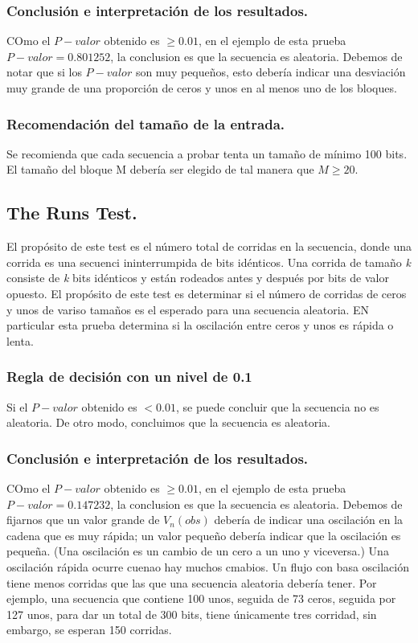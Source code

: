 \documentclass{llncs}
\theoremstyle{plane}
\begin{document}
\subsubsection{Conclusión e interpretación de los resultados.}
COmo el $P-valor$ obtenido es $\geq 0.01$, en el ejemplo de esta prueba $P-valor =0.801252$, la conclusion es que la secuencia es aleatoria.
Debemos de notar que si los $P-valor$ son muy pequeños, esto debería indicar una desviación muy grande de una proporción de ceros y unos en al menos  uno de los bloques.

\subsubsection{Recomendación del tamaño de la entrada.}
Se recomienda que cada secuencia a probar tenta un tamaño de mínimo 100 bits. El tamaño del bloque M debería ser elegido de tal manera que $M \geq 20$.

\subsection{The Runs Test.}
El propósito de este test es el número total de corridas en la secuencia, donde una corrida es una secuenci ininterrumpida de bits idénticos. Una corrida de tamaño \textit{k} consiste de \textit{k} bits idénticos y están rodeados antes y después por bits de valor opuesto. El propósito de este test es determinar si el número de corridas de ceros y unos de variso tamaños es el esperado para una secuencia aleatoria. EN particular esta prueba determina si la oscilación entre ceros y unos es rápida o lenta.
\subsubsection{Regla de decisión con un nivel de 0.1}
Si el $P-valor$ obtenido es $<0.01$, se puede concluir que la secuencia no es aleatoria. De otro modo, concluimos que la secuencia es aleatoria.
\subsubsection{Conclusión e interpretación de los resultados.}
COmo el $P-valor$ obtenido es $\geq 0.01$, en el ejemplo de esta prueba $P-valor =0.147232$, la conclusion es que la secuencia es aleatoria.
Debemos de fijarnos que un valor grande de $V_{n}(obs)$ debería de indicar una oscilación en la cadena que es muy rápida; un valor pequeño debería indicar que la oscilación es pequeña. (Una oscilación es un cambio de un cero a un uno y viceversa.) Una oscilación rápida ocurre cuenao hay muchos cmabios. Un flujo con basa oscilación tiene menos corridas que las que una secuencia aleatoria debería tener. Por ejemplo, una secuencia que contiene 100 unos, seguida de 73 ceros, seguida por 127 unos, para dar un total de 300 bits, tiene únicamente tres corridad, sin embargo, se esperan 150 corridas.
\end{document}
